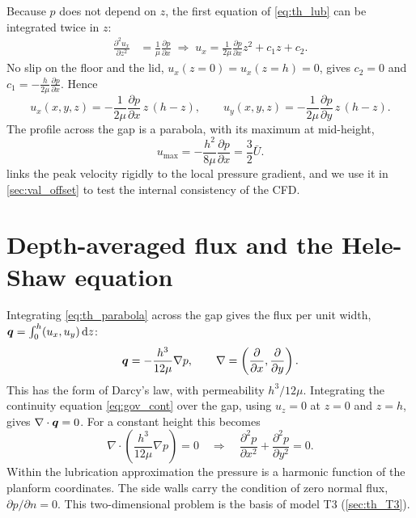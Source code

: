 Because $p$ does not depend on $z$, the first equation of \cref{eq:th_lub} can be integrated twice in $z$:
\begin{align}
\frac{\partial^2u_x}{\partial z^2}&=\frac{1}{\mu}\frac{\partial p}{\partial x}
\;\Rightarrow\;
u_x=\frac{1}{2\mu}\frac{\partial p}{\partial x}z^2+c_1z+c_2 .
\end{align}
No slip on the floor and the lid, $u_x(z=0)=u_x(z=h)=0$, gives $c_2=0$ and $c_1=-\frac{h}{2\mu}\frac{\partial p}{\partial x}$. Hence
\begin{equation}
u_x(x,y,z)=-\frac{1}{2\mu}\frac{\partial p}{\partial x}\,z\,(h-z),
\qquad
u_y(x,y,z)=-\frac{1}{2\mu}\frac{\partial p}{\partial y}\,z\,(h-z).
\label{eq:th_parabola}
\end{equation}
The profile across the gap is a parabola, with its maximum at mid-height,
\begin{equation}
u_{\max}=-\frac{h^2}{8\mu}\frac{\partial p}{\partial x}=\frac32\bar U .
\label{eq:th_umax}
\end{equation}
 links the peak velocity rigidly to the local pressure gradient, and we use it in \cref{sec:val_offset} to test the internal consistency of the CFD.

\section{Depth-averaged flux and the Hele-Shaw equation}

Integrating \cref{eq:th_parabola} across the gap gives the flux per unit width, $\bm{q}=\int_0^h(u_x,u_y)\,\mathrm{d} z$:
\begin{equation}
\bm{q}=-\frac{h^3}{12\mu}\nabla p ,
\qquad \nabla=\left(\frac{\partial}{\partial x},\frac{\partial}{\partial y}\right).
\label{eq:th_darcy}
\end{equation}
This has the form of Darcy's law, with permeability $h^3/12\mu$. Integrating the continuity equation \cref{eq:gov_cont} over the gap, using $u_z=0$ at $z=0$ and $z=h$, gives $\nabla\cdot\bm{q}=0$. For a constant height this becomes
\begin{equation}
\nabla\cdot\left(\frac{h^3}{12\mu}\nabla p\right)=0
\quad\Longrightarrow\quad
\frac{\partial^2p}{\partial x^2}+\frac{\partial^2p}{\partial y^2}=0 .
\label{eq:th_laplace}
\end{equation}
Within the lubrication approximation the pressure is a harmonic function of the planform coordinates. The side walls carry the condition of zero normal flux, $\partial p/\partial n=0$. This two-dimensional problem is the basis of model T3 (\cref{sec:th_T3}).

